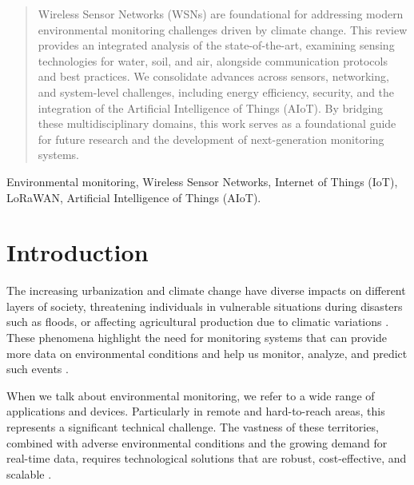 \documentclass[conference]{IEEEtran}
\begin{document}
\maketitle

\begin{abstract}
Wireless Sensor Networks (WSNs) are foundational for addressing modern environmental monitoring challenges driven by climate change. This review provides an integrated analysis of the state-of-the-art, examining sensing technologies for water, soil, and air, alongside communication protocols and best practices. We consolidate advances across sensors, networking, and system-level challenges, including energy efficiency, security, and the integration of the Artificial Intelligence of Things (AIoT). By bridging these multidisciplinary domains, this work serves as a foundational guide for future research and the development of next-generation monitoring systems.
\end{abstract}

\begin{IEEEkeywords}
Environmental monitoring, Wireless Sensor Networks, Internet of Things (IoT), LoRaWAN, Artificial Intelligence of Things (AIoT).
\end{IEEEkeywords}

\section{Introduction}
The increasing urbanization and climate change have diverse impacts on different layers of society, threatening individuals in vulnerable situations during disasters such as floods, or affecting agricultural production due to climatic variations \cite{jonkman_2005_global}. These phenomena highlight the need for monitoring systems that can provide more data on environmental conditions and help us monitor, analyze, and predict such events \cite{hall_2014_understanding}.

When we talk about environmental monitoring, we refer to a wide range of applications and devices. Particularly in remote and hard-to-reach areas, this represents a significant technical challenge. The vastness of these territories, combined with adverse environmental conditions and the growing demand for real-time data, requires technological solutions that are robust, cost-effective, and scalable \cite{chen_2013_natural, yellampalli_2021_wireless }.
\end{document}
